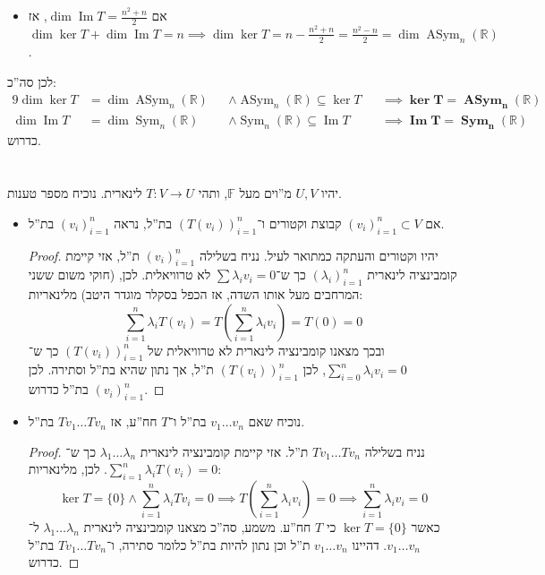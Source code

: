 \documentclass[]{article}
\newcommand\R     {\mathbb{R}}
\DeclareMathOperator\Img   {Im}
\newcommand\sumni     {\sum_{i = 0}^{n}}
\newcommand\sumnio    {\sum_{i = 1}^{n}}
\DeclareMathOperator{\Sym}     {Sym}
\DeclareMathOperator{\Asym}    {ASym}
\newcommand\F         {\mathbb{F}}
\newcommand\co        {\colon}
\renewcommand\lg      {\lambda}
\newcommand\cl [1]    {\left ( #1 \right )}
\theoremstyle{definition}
\begin{document}
\begin{enumerate}[(1)]
\begin{itemize}
            \item אם $\dim \Img T = \frac{n^2 + n}{2}$, אז $\dim \ker T + \dim \Img T = n \implies \dim \ker T = n - \frac{n^2 + n}{2} = \frac{n^2 - n}{2} = \dim \Asym_n(\R)$. 
        \end{itemize}
        לכן סה''כ: 
        \begin{alignat*}{9}
            \dim \ker T &= \dim \Asym_n(\R) &&\land \Asym_n(\R) \subseteq \ker T &&\implies \bm{\ker T = \Asym_n(\R)} \\
            \dim \Img T &= \dim \Sym_n(\R) && \land \Sym_n(\R) \subseteq \Img T &&\implies \bm{\Img T = \Sym_n(\R)}
        \end{alignat*}
        כדרוש. 
    \end{enumerate}
    
    \section{}
    יהיו $U, V$ מ''וים מעל $\F$, ותהי $T \co V \to U$ לינארית. נוכיח מספר טענות. 
    \begin{itemize}
        \item אם $(v_i)_{i = 1}^{n} \subset V$ קבוצת וקטורים ו־$(T(v_i))_{i = 1}^{n}$ בת''ל, נראה $(v_i)_{i = 1}^{n}$ בת''ל. \begin{proof}
            יהיו וקטורים והעתקה כמתואר לעיל. נניח בשלילה $(v_i)_{i = 1}^{n}$ ת''ל, אזי קיימת קומבינציה לינארית $(\lg_i)_{i = 1}^{n}$ כך ש־$\sum \lg_i v_i = 0$ לא טרוויאלית. לכן, (חוקי משום ששני המרחבים מעל אותו השדה, אז הכפל בסקלר מוגדר היטב) מלינאריות: 
            \[ \sum_{i = 1}^{n}\lg_iT(v_i) = T\cl{\sum_{i = 1}^{n}\lg_i v_i} = T(0) = 0 \]
            ובכך מצאנו קומבינציה לינארית לא טרוויאלית של $(T(v_i))_{i = 1}^{n}$ כך ש־$\sumni \lg_i v_i = 0$, לכן $(T(v_i))_{i = 1}^{n}$ ת''ל, אך נתון שהיא בת''ל וסתירה. לכן $(v_i)_{i = 1}^{n}$ בת''ל כדרוש. 
        \end{proof}
        \item נוכיח שאם $v_1 \dots v_n$ בת''ל ו־$T$ חח''ע, אז $Tv_1 \dots Tv_n$ בת''ל. \begin{proof}
            נניח בשלילה $Tv_1 \dots Tv_n$ ת''ל. אזי קיימת קומבינציה לינארית $\lg_1 \dots \lg_n$ כך ש־$\sumnio \lg_i T(v_i) = 0$. לכן, מלינאריות: 
            \[ \ker T = \{0\} \land \sumnio \lg_i Tv_i = 0 \implies T\cl{\sumnio \lg_i v_i} = 0 \implies \sumnio \lg_i v_i = 0 \]
            כאשר $\ker T = \{0\}$ כי $T$ חח''ע. משמע, סה''כ מצאנו קומבינציה לינארית $\lg_1 \dots \lg_n$ ל־$v_1 \dots v_n$. דהיינו $v_1 \dots v_n$ ת''ל וכן נתון להיות בת''ל כלומר סתירה, ו־$Tv_1 \dots Tv_n$ בת''ל כדרוש. 
        \end{proof}
    \end{itemize}
    
\end{document}
